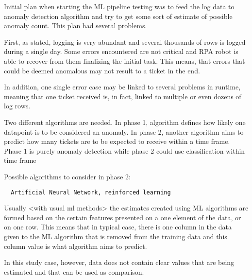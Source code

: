 Initial plan when starting the ML pipeline testing
was to feed the log data to anomaly detection algorithm
and try to get some sort of estimate of possible anomaly count.
This plan had several problems.

First, as stated, logging is very abundant
and several thousands of rows is logged
during a single day.
Some errors encountered are not critical
and RPA robot is able to recover from them
finalizing the initial task.
This means, that errors that could be deemed anomalous
may not result to a ticket in the end.

In addition,
one single error case
may be linked to several problems in runtime,
meaning that one ticket received is,
in fact, linked to multiple or
even dozens of log rows.



Two different algorithms are needed.
In phase 1,
algorithm defines how likely one datapoint
is to be considered an anomaly.
In phase 2,
another algorithm aims to predict
how many tickets are to be expected to receive
within a time frame.
Phase 1 is purely anomaly detection
while phase 2 could use
classification within time frame

Possible algorithms to consider in phase 2:
\begin{verbatim}
  Artificial Neural Network, reinforced learning
\end{verbatim}


Usually <with usual ml methods> the estimates
created using ML algorithms
are formed based on the certain features
presented on a one element of the data,
or on one row.
This means that in typical case,
there is one column in the data
given to the ML algorithm
that is removed from the training data
and this column value is what algorithm
aims to predict.

In this study case, however,
data does not contain clear values
that are being estimated
and that can be used as comparison.


